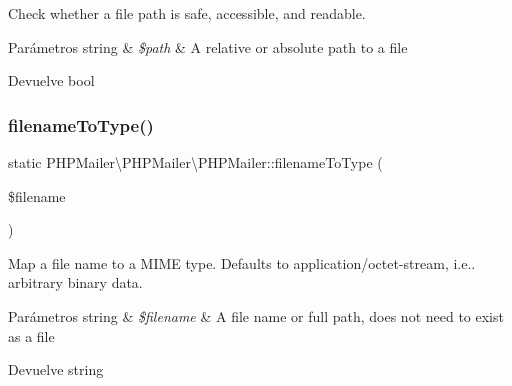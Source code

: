 Check whether a file path is safe, accessible, and readable.


\begin{DoxyParams}[1]{Parámetros}
string & {\em \$path} & A relative or absolute path to a file\\
\hline
\end{DoxyParams}
\begin{DoxyReturn}{Devuelve}
bool 
\end{DoxyReturn}
\mbox{\label{classPHPMailer_1_1PHPMailer_1_1PHPMailer_ad64d9facc15ec7c747f629db8ddf1c0a}} 
\subsubsection{\texorpdfstring{filename\+To\+Type()}{filenameToType()}}
{\footnotesize\ttfamily static P\+H\+P\+Mailer\textbackslash{}\+P\+H\+P\+Mailer\textbackslash{}\+P\+H\+P\+Mailer\+::filename\+To\+Type (\begin{DoxyParamCaption}\item[{}]{\$filename }\end{DoxyParamCaption})\hspace{0.3cm}{\ttfamily [static]}}

Map a file name to a M\+I\+ME type. Defaults to \textquotesingle{}application/octet-\/stream\textquotesingle{}, i.\+e.. arbitrary binary data.


\begin{DoxyParams}[1]{Parámetros}
string & {\em \$filename} & A file name or full path, does not need to exist as a file\\
\hline
\end{DoxyParams}
\begin{DoxyReturn}{Devuelve}
string 
\end{DoxyReturn}
\mbox{\label{classPHPMailer_1_1PHPMailer_1_1PHPMailer_a6ac2799cc5bd5bbd315401918dcdf7de}} 
